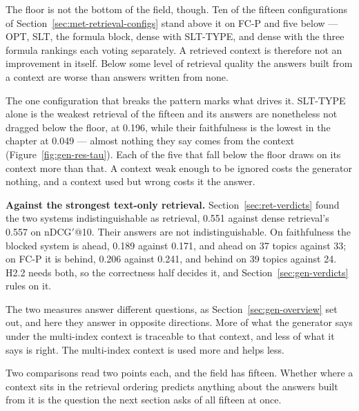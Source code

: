 The floor is not the bottom of the field, though. Ten of the fifteen configurations of
Section~\ref{sec:met-retrieval-configs} stand above it on FC-P and five below --- OPT, SLT,
the formula block, dense with SLT-TYPE, and dense with the three formula rankings each voting
separately. A retrieved context is therefore not an improvement in itself. Below some level of
retrieval quality the answers built from a context are worse than answers written from none.

The one configuration that breaks the pattern marks what drives it. SLT-TYPE alone is the
weakest retrieval of the fifteen and its answers are nonetheless not dragged below the floor,
at 0.196, while their faithfulness is the lowest in the chapter at 0.049 --- almost nothing they say
comes from the context (Figure~\ref{fig:gen-res-tau}). Each of the five that fall below the floor draws on its context more
than that. A context weak enough to be ignored costs the generator nothing, and a context used
but wrong costs it the answer.

\textbf{Against the strongest text-only retrieval.} Section~\ref{sec:ret-verdicts} found the
two systems indistinguishable as retrieval, 0.551 against dense retrieval's 0.557 on
nDCG$'$@10. Their answers are not indistinguishable. On faithfulness the blocked system is
ahead, 0.189 against 0.171, and ahead on 37 topics against 33; on FC-P it is behind, 0.206
against 0.241, and behind on 39 topics against 24. H2.2 needs both, so the correctness half
decides it, and Section~\ref{sec:gen-verdicts} rules on it.

The two measures answer different questions, as Section~\ref{sec:gen-overview} set out, and
here they answer in opposite directions. More of what the generator says under the multi-index
context is traceable to that context, and less of what it says is right. The multi-index
context is used more and helps less.

Two comparisons read two points each, and the field has fifteen. Whether where a context sits
in the retrieval ordering predicts anything about the answers built from it is the question
the next section asks of all fifteen at once.

